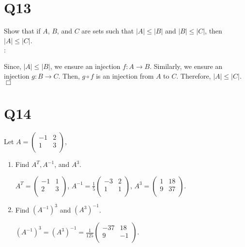\documentclass[11pt]{article}
\newenvironment{qparts}{\begin{enumerate}[{(}a{)}]}{\end{enumerate}}
\def\endproofmark{$\Box$}
\newenvironment{proof}{{\bf Proof}:}{\endproofmark\smallskip}
\begin{document}
\section*{Q13}
Show that if $A$, $ B$, and $C$ are sets such that $\left\vert A  \right\vert \le \left\vert B  \right\vert $ and
$\left\vert B  \right\vert \le \left\vert C  \right\vert $, then 
$\left\vert A \right\vert \le \left\vert C \right\vert  $.\\
\begin{proof}
    
    Since, $\left\vert A  \right\vert \le \left\vert B  \right\vert $, we ensure an injection $f \colon A \to B$. Similarly, we ensure an 
    injection $g\colon B \to C$. Then, $g \circ  f$ is an injection from $A$ 
    to $C$. Therefore, $\left\vert A  \right\vert \le \left\vert C  \right\vert $.
\end{proof}



\section*{Q14}
Let $A=\begin{pmatrix}
-1 & 2 \\
1  & 3 \\
\end{pmatrix}$,
\begin{qparts}
    
    \item Find $A^{T}, A^{-1}$, and $A^{3}$.
    
    $A^{T}=\begin{pmatrix}
        -1 & 1 \\
        2  & 3 \\
        \end{pmatrix}$,
    $A ^{-1}=\frac{1}{5} \begin{pmatrix}
        -3 & 2 \\
        1  & 1 \\
        \end{pmatrix}$,
    $A ^{3}=\begin{pmatrix}
        1 & 18 \\
        9  & 37 \\
        \end{pmatrix}$.
    
    \item Find $(A ^{-1})^{3}$ and $(A^{3})^{-1}$.
    
    $(A ^{-1})^{3}=(A^{3})^{-1}=\frac{1}{125}\begin{pmatrix}
        -37 & 18 \\
        9 & -1 \\
        \end{pmatrix}$.
\end{qparts}
\end{document}
